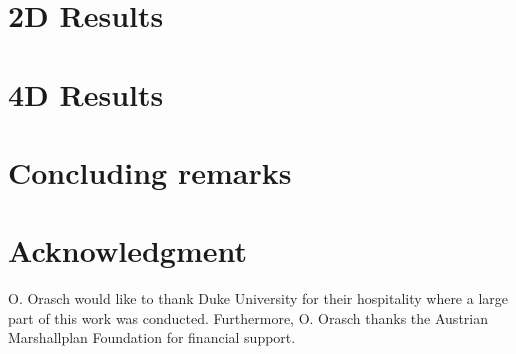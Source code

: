 \documentclass{PoS}
\begin{document}
\section{2D Results}

\newpage

\section{4D Results}

\newpage


\section{Concluding remarks}

\section{Acknowledgment}
O. Orasch would like to thank Duke University for their hospitality where a large part of this work was conducted. Furthermore, O. Orasch thanks the Austrian Marshallplan Foundation for financial support.
 
\end{document}
